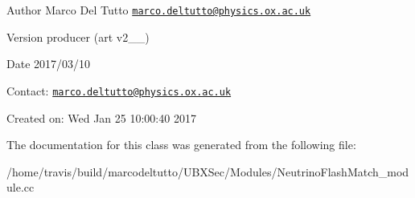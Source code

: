 \begin{DoxyAuthor}{Author}
Marco Del Tutto \href{mailto:marco.deltutto@physics.ox.ac.uk}{\tt marco.\-deltutto@physics.\-ox.\-ac.\-uk}
\end{DoxyAuthor}
\begin{DoxyVersion}{Version}
producer (art v2\-\_\-\_)
\end{DoxyVersion}
\begin{DoxyDate}{Date}
2017/03/10
\end{DoxyDate}
Contact\-: \href{mailto:marco.deltutto@physics.ox.ac.uk}{\tt marco.\-deltutto@physics.\-ox.\-ac.\-uk}

Created on\-: Wed Jan 25 10\-:00\-:40 2017 

The documentation for this class was generated from the following file\-:\begin{DoxyCompactItemize}
\item 
/home/travis/build/marcodeltutto/\-U\-B\-X\-Sec/\-Modules/Neutrino\-Flash\-Match\-\_\-module.\-cc\end{DoxyCompactItemize}
